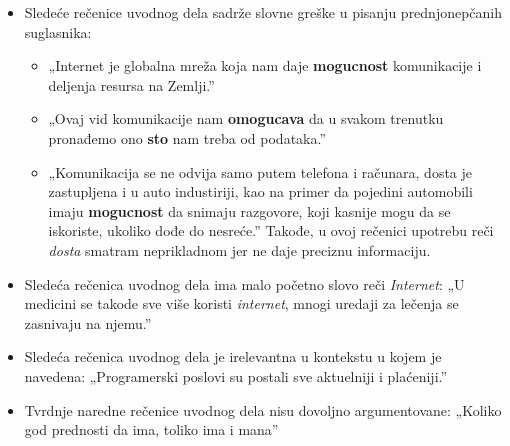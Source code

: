 \documentclass[a4paper]{report}
\newcommand{\odgovor}[1]{\textcolor{blue}{#1}}
\begin{document}
\begin{itemize}
    \item Sledeće rečenice uvodnog dela sadrže slovne greške u pisanju prednjonepčanih suglasnika:
    \begin{itemize}
    \item„Internet je globalna mreža koja nam daje \textbf{mogucnost} komunikacije i deljenja resursa na Zemlji.”
    
    \odgovor{}
    \end{itemize}
    \begin{itemize}
    \item „Ovaj vid komunikacije nam \textbf{omogucava} da u svakom trenutku pronađemo ono  \textbf{sto} nam treba od podataka.”
   
    \odgovor{}
    \end{itemize}
     \begin{itemize}
    \item „Komunikacija se ne odvija samo putem telefona i računara, dosta je zastupljena i u auto industiriji, kao na primer da pojedini automobili imaju \textbf{mogucnost} da snimaju razgovore, koji kasnije mogu da se iskoriste, ukoliko dođe do nesreće.”\newline
    Takođe, u ovoj rečenici upotrebu reči \textit{dosta} smatram neprikladnom jer ne daje preciznu informaciju. 
    
    \odgovor{}
    
    
    \end{itemize}
\end{itemize}
\begin{itemize}
    \item Sledeća rečenica uvodnog dela ima malo početno slovo reči \textit{Internet}:\newline
       „U medicini se takode sve više koristi \textit{internet}, mnogi uredaji za lečenja se zasnivaju na njemu.”

    \odgovor{}
       
\end{itemize}
\begin{itemize}
    \item Sledeća rečenica uvodnog dela je irelevantna u kontekstu u kojem je navedena:\newline
    „Programerski poslovi su postali sve aktuelniji i plaćeniji.”
    
    \odgovor{}
    
\end{itemize}
\begin{itemize}
    \item Tvrdnje naredne rečenice uvodnog dela nisu dovoljno argumentovane:\newline
    „Koliko god prednosti da ima, toliko ima i mana”
    
    \odgovor{}
    
\end{itemize}
\end{document}

